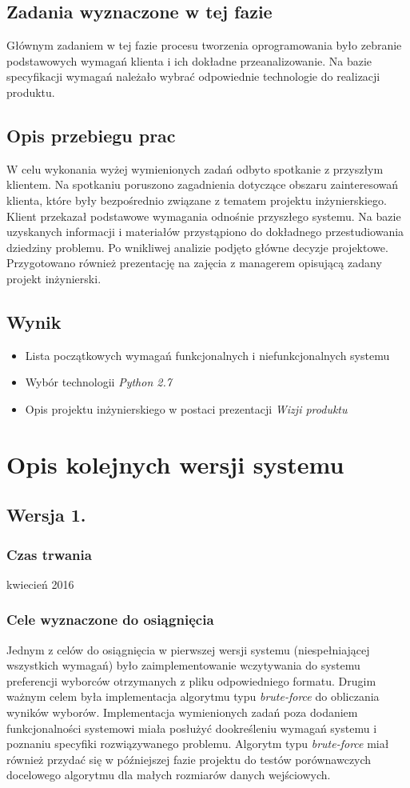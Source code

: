 \documentclass[pdflatex,11pt]{../aghdoc_version2}
\begin{document}
\subsection{Zadania wyznaczone w tej fazie}
Głównym zadaniem w tej fazie procesu tworzenia oprogramowania było zebranie
podstawowych wymagań klienta i ich dokładne przeanalizowanie. Na bazie specyfikacji
wymagań należało wybrać odpowiednie technologie do realizacji produktu.
\subsection{Opis przebiegu prac}
W celu wykonania wyżej wymienionych zadań odbyto spotkanie z przyszłym klientem. Na
spotkaniu poruszono zagadnienia dotyczące obszaru zainteresowań klienta, które były
bezpośrednio związane z tematem projektu inżynierskiego. Klient przekazał podstawowe wymagania odnośnie przyszłego systemu. Na bazie uzyskanych informacji i materiałów
przystąpiono do dokładnego przestudiowania dziedziny problemu. Po wnikliwej analizie
podjęto główne decyzje projektowe. Przygotowano również prezentację na zajęcia z
managerem opisującą zadany projekt inżynierski.

\subsection{Wynik}
\begin{itemize}
\item Lista początkowych wymagań funkcjonalnych i niefunkcjonalnych systemu
\item Wybór technologii \textit{Python 2.7}
\item Opis projektu inżynierskiego w postaci prezentacji \textit{Wizji produktu}
\end{itemize}

\newpage
\section{Opis kolejnych wersji systemu}
\subsection{Wersja 1.}
\subsubsection{Czas trwania}
kwiecień 2016
\subsubsection{Cele wyznaczone do osiągnięcia}
Jednym z celów do osiągnięcia w pierwszej wersji systemu (niespełniającej wszystkich
wymagań) było zaimplementowanie wczytywania do systemu preferencji wyborców
otrzymanych z pliku odpowiedniego formatu. Drugim ważnym celem była implementacja
algorytmu typu \textit{brute-force} do obliczania wyników wyborów. Implementacja wymienionych
zadań poza dodaniem funkcjonalności systemowi miała posłużyć dookreśleniu wymagań
systemu i poznaniu specyfiki rozwiązywanego problemu. Algorytm typu \textit{brute-force} miał
również przydać się w późniejszej fazie projektu do testów porównawczych docelowego
algorytmu dla małych rozmiarów danych wejściowych.
\end{document}
